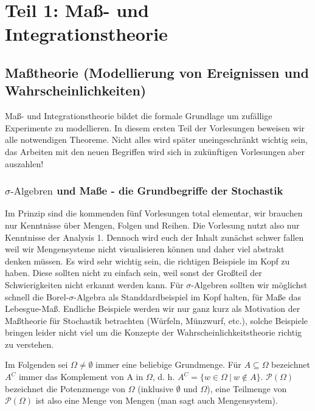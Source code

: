 
	\part*{Teil 1: Maß- und Integrationstheorie}


\chapter{Maßtheorie (Modellierung von Ereignissen und Wahrscheinlichkeiten)}
	\marginpar{\textcolor{red}{Vorlesung 1}}
Ma\ss - und Integrationstheorie bildet die formale Grundlage um zuf\"allige Experimente zu modellieren. In diesem ersten Teil der Vorlesungen beweisen wir alle notwendigen Theoreme. Nicht alles wird sp\"ater uneingeschr\"ankt wichtig sein, das Arbeiten mit den neuen Begriffen wird sich in zuk\"unftigen Vorlesungen aber auszahlen!


\section{$\sigma\text{-Algebren}$ und Maße - die Grundbegriffe der Stochastik}\label{sigmaalgebra}
Im Prinzip sind die kommenden f\"unf Vorlesungen total elementar, wir brauchen nur Kenntnisse \"uber Mengen, Folgen und Reihen. Die Vorlesung nutzt also nur Kenntnisse der Analysis 1. Dennoch wird euch der Inhalt zun\"achst schwer fallen weil wir Mengensysteme nicht visualisieren k\"onnen und daher viel abstrakt denken m\"ussen. Es wird sehr wichtig sein, die richtigen Beispiele im Kopf zu haben. Diese sollten nicht zu einfach sein, weil sonst der Gro\ss teil der Schwierigkeiten nicht erkannt werden kann. F\"ur $\sigma$-Algebren sollten wir m\"oglichst schnell die Borel-$\sigma$-Algebra als Standdardbeispiel im Kopf halten, f\"ur Ma\ss e das Lebesgue-Ma\ss. Endliche Beispiele werden wir nur ganz kurz als Motivation der Ma\ss theorie f\"ur Stochastik betrachten (W\"urfeln, M\"unzwurf, etc.), solche Beispiele bringen leider nicht viel um die Konzepte der Wahrscheinlichkeitstheorie richtig zu verstehen.\smallskip

Im Folgenden sei $\Omega \neq \emptyset $ immer eine beliebige Grundmenge. Für $A \subseteq \Omega$ bezeichnet $A^C$ immer das Komplement von A in $\Omega$, d. h. $A^C = \{ w \in \Omega \: | \: w \notin A \}$. $\mathcal{P}(\Omega)$ bezeichnet die Potenzmenge von $\Omega$ (inklusive $\emptyset$ und $\Omega$), eine Teilmenge von $\mathcal{P}(\Omega)$ ist also eine Menge von Mengen (man sagt auch Mengensystem).




